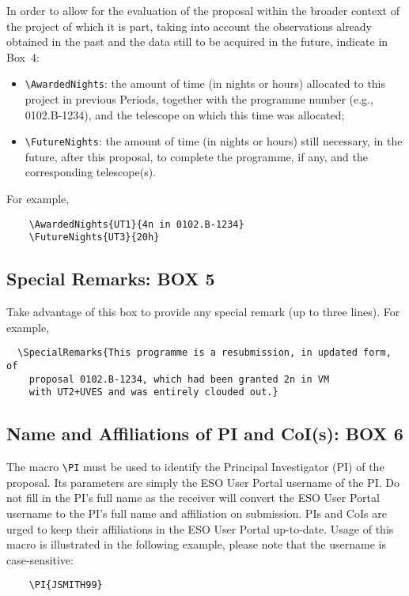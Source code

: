 \documentclass{article}
\begin{document}
In order to allow for the evaluation of the proposal within the
broader context of the project of which it is part, taking into
account the observations already obtained in the past and the data
still to be acquired in the future, indicate in Box~4:
\begin{itemize}
\item \verb|\AwardedNights|: the amount of time (in nights or hours)
  allocated to this project in previous Periods, together with the
  programme number (e.g., 0102.B-1234), and the telescope
  on which this time was allocated;
\item \verb|\FutureNights|: the amount of time (in nights or hours)
  still necessary, in the future, after this proposal, to complete the
  programme, if any, and the corresponding telescope(s). 
\end{itemize}

For example,
\begin{verbatim}
    \AwardedNights{UT1}{4n in 0102.B-1234}
    \FutureNights{UT3}{20h}
\end{verbatim} 

\subsection{Special Remarks: {\bf BOX 5}}

Take advantage of this box to provide any special remark (up to three
lines). For example,
\begin{verbatim}
  \SpecialRemarks{This programme is a resubmission, in updated form, of
    proposal 0102.B-1234, which had been granted 2n in VM
    with UT2+UVES and was entirely clouded out.}
\end{verbatim}

\subsection{Name and Affiliations of PI and CoI(s): {\bf BOX 6}}

The macro \verb|\PI| must be used to identify the Principal
Investigator (PI) of the proposal. Its parameters are simply the 
ESO User Portal username of the PI. Do not fill in the PI's full
name as the receiver will convert the ESO User Portal username
to the PI's full name and affiliation on submission. PIs and CoIs are urged to keep their affiliations in the ESO User Portal up-to-date.
Usage of this macro is illustrated in the following example, please note that the username is case-sensitive:
\begin{verbatim}
    \PI{JSMITH99}
\end{verbatim}
\end{document}
